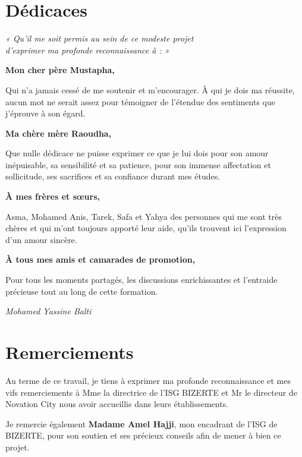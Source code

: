 \documentclass[12pt,a4paper]{report}
\begin{document}
\chapter*{Dédicaces}

\begin{center}
\textit{« Qu'il me soit permis au sein de ce modeste projet\\
d'exprimer ma profonde reconnaissance à : »}
\end{center}

\textbf{Mon cher père Mustapha,}

Qui n'a jamais cessé de me soutenir et m'encourager. À qui je dois ma réussite,
aucun mot ne serait assez pour témoigner de l'étendue des sentiments que j'éprouve à
son égard.

\textbf{Ma chère mère Raoudha,}

Que nulle dédicace ne puisse exprimer ce que je lui dois pour son amour inépuisable,
sa sensibilité et sa patience, pour son immense affectation et sollicitude, ses sacrifices
et sa confiance durant mes études.

\textbf{À mes frères et sœurs,}

Asma, Mohamed Anis, Tarek, Safa et Yahya des personnes qui me sont très chères
et qui m'ont toujours apporté leur aide, qu'ils trouvent ici l'expression d'un amour sincère.

\textbf{À tous mes amis et camarades de promotion,}

Pour tous les moments partagés, les discussions enrichissantes et l'entraide précieuse
tout au long de cette formation.

\hfill \textit{Mohamed Yassine Balti}

\chapter*{Remerciements}

Au terme de ce travail, je tiens à exprimer ma profonde reconnaissance et mes vifs
remerciements à Mme la directrice de l'ISG BIZERTE et Mr le directeur de Novation
City nous avoir accueillis dans leurs établissements.

Je remercie également \textbf{Madame Amel Hajji}, mon encadrant de l'ISG de BIZERTE,
pour son soutien et ses précieux conseils afin de mener à bien ce projet.
\end{document}
